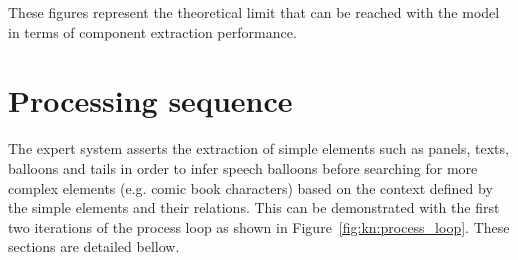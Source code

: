 These figures represent the theoretical limit that can be reached with the model in terms of component extraction performance.

\section{Processing sequence} %
\label{sec:kn:framework_}
The expert system asserts the extraction of simple elements such as panels, texts, balloons and tails in order to infer speech balloons before searching for more complex elements (e.g. comic book characters) based on the context defined by the simple elements and their relations.
This can be demonstrated with the first two iterations of the process loop as shown in Figure~\ref{fig:kn:process_loop}.
These sections are detailed bellow.



          
